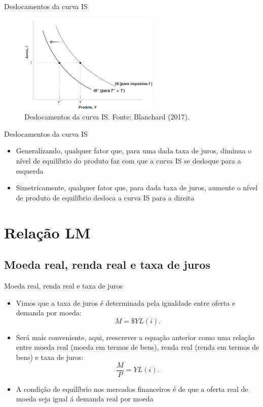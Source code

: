 \documentclass[10pt]{beamer}
\begin{document}
\begin{frame}{Deslocamentos da curva IS}
\begin{figure}
    \centering
    \includegraphics[width=0.6\textwidth]{./figures/aula082_fig2.JPG}
    \caption{Deslocamentos da curva IS. Fonte: Blanchard (2017).}
    \label{fig:IS2}
\end{figure}
\end{frame}

\begin{frame}{Deslocamentos da curva IS}
\begin{itemize}
    \item Generalizando, qualquer fator que, para uma dada taxa de juros, diminua o nível de equilíbrio do produto faz com que a curva IS se desloque para a esquerda
    \bigskip
    \item Simetricamente, qualquer fator que, para dada taxa de juros, aumente o nível de produto de equilíbrio desloca a curva IS para a direita
\end{itemize}
\end{frame}

\section{Relação LM}
\subsection{Moeda real, renda real e taxa de juros}
\begin{frame}{Moeda real, renda real e taxa de juros}
    \begin{itemize}
        \item Vimos que a taxa de juros é determinada pela igualdade entre oferta e demanda por moeda:
        \begin{equation}
            M = \$YL(i).
        \end{equation}
        \bigskip
        \item Será mais conveniente, aqui, reescrever a equação anterior como uma relação entre moeda real (moeda em termos de bens), renda real (renda em termos de bens) e taxa de juros:
        \begin{equation}
            \frac{M}{P} = YL(i). \tag{LM}
            \label{eq4}
        \end{equation}
        \bigskip
        \item A condição de equilíbrio nos mercados financeiros é de que a oferta real de moeda seja igual á demanda real por moeda        
    \end{itemize}
\end{frame}
\end{document}
